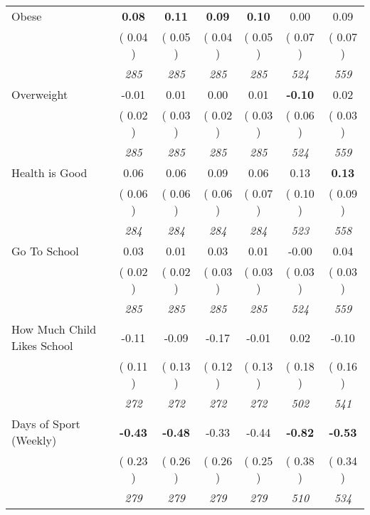 \begin{tabular}{l c c c c c c}
Obese & \textbf{      0.08 } & \textbf{      0.11 } & \textbf{      0.09 } & \textbf{     0.10} &      0.00 &      0.09 \\
& (     0.04 ) & (     0.05 ) & (     0.04 ) & (     0.05 ) & (     0.07 ) & (     0.07 ) \\
& \textit{ 285 } & \textit{ 285 } & \textit{ 285 } & \textit{ 285 } & \textit{ 524 } & \textit{ 559 } \\
Overweight &     -0.01 &      0.01 &      0.00 &      0.01 & \textbf{     -0.10 } &      0.02 \\
& (     0.02 ) & (     0.03 ) & (     0.02 ) & (     0.03 ) & (     0.06 ) & (     0.03 ) \\
& \textit{ 285 } & \textit{ 285 } & \textit{ 285 } & \textit{ 285 } & \textit{ 524 } & \textit{ 559 } \\
Health is Good &      0.06 &      0.06 &      0.09 &      0.06 &      0.13 & \textbf{      0.13 } \\
& (     0.06 ) & (     0.06 ) & (     0.06 ) & (     0.07 ) & (     0.10 ) & (     0.09 ) \\
& \textit{ 284 } & \textit{ 284 } & \textit{ 284 } & \textit{ 284 } & \textit{ 523 } & \textit{ 558 } \\
Go To School &      0.03 &      0.01 &      0.03 &      0.01 &     -0.00 &      0.04 \\
& (     0.02 ) & (     0.02 ) & (     0.03 ) & (     0.03 ) & (     0.03 ) & (     0.03 ) \\
& \textit{ 285 } & \textit{ 285 } & \textit{ 285 } & \textit{ 285 } & \textit{ 524 } & \textit{ 559 } \\
How Much Child Likes School &     -0.11 &     -0.09 &     -0.17 &     -0.01 &      0.02 &     -0.10 \\
& (     0.11 ) & (     0.13 ) & (     0.12 ) & (     0.13 ) & (     0.18 ) & (     0.16 ) \\
& \textit{ 272 } & \textit{ 272 } & \textit{ 272 } & \textit{ 272 } & \textit{ 502 } & \textit{ 541 } \\
Days of Sport (Weekly) & \textbf{     -0.43 } & \textbf{     -0.48 } &     -0.33 &     -0.44 & \textbf{     -0.82 } & \textbf{     -0.53 } \\
& (     0.23 ) & (     0.26 ) & (     0.26 ) & (     0.25 ) & (     0.38 ) & (     0.34 ) \\
& \textit{ 279 } & \textit{ 279 } & \textit{ 279 } & \textit{ 279 } & \textit{ 510 } & \textit{ 534 } \\
\bottomrule
\end{tabular}
